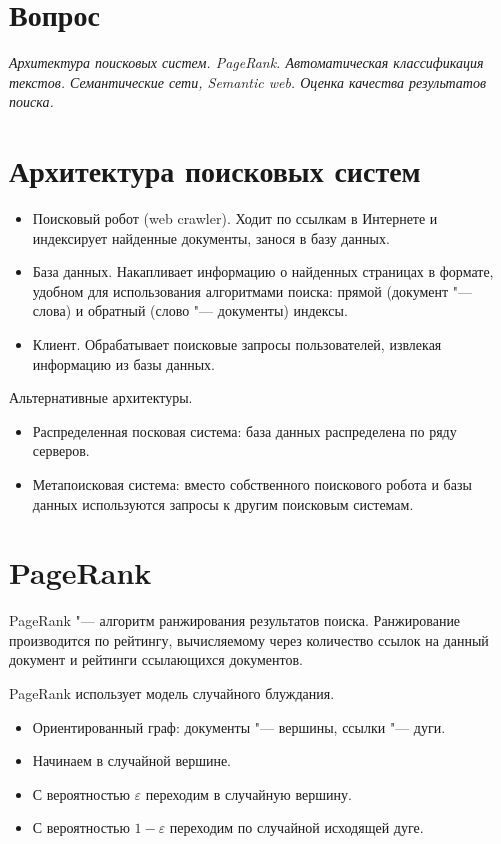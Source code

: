 \documentclass[a4paper,12pt]{article}
\renewcommand{\epsilon}{\varepsilon}
\begin{document}
\section*{Вопрос }
{\em Архитектура поисковых систем. PageRank. Автоматическая
классификация текстов. Семантические сети, Semantic web.
Оценка качества результатов поиска.}


\section{Архитектура поисковых систем}

\begin{itemize}
\item Поисковый робот (web crawler). Ходит по ссылкам в Интернете
и индексирует найденные документы, занося в базу данных.
\item База данных. Накапливает информацию о найденных страницах
в формате, удобном для использования алгоритмами поиска: прямой
(документ "--- слова) и обратный (слово "--- документы) индексы.
\item Клиент. Обрабатывает поисковые запросы пользователей, извлекая
информацию из базы данных.
\end{itemize}

Альтернативные архитектуры.
\begin{itemize}
\item Распределенная посковая система: база данных распределена
по ряду серверов.
\item Метапоисковая система: вместо собственного поискового робота
и базы данных используются запросы к другим поисковым системам.
\end{itemize}


\section{PageRank}

PageRank "--- алгоритм ранжирования результатов поиска. Ранжирование
производится по рейтингу, вычисляемому через количество ссылок
на данный документ и рейтинги ссылающихся документов.

PageRank использует модель случайного блуждания.
\begin{itemize}
\item Ориентированный граф: документы "--- вершины, ссылки "--- дуги.
\item Начинаем в случайной вершине.
\item С вероятностью $\epsilon$ переходим в случайную вершину.
\item С вероятностью $1-\epsilon$ переходим по случайной исходящей дуге.
\end{itemize}
\end{document}
